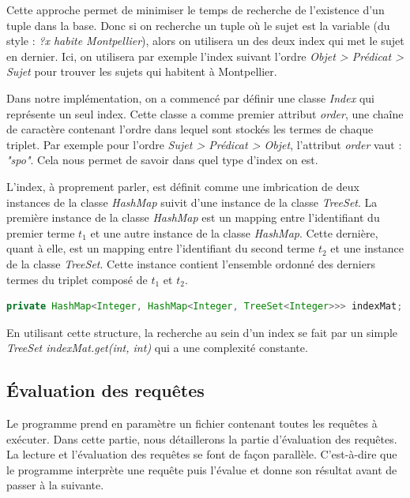 \documentclass[12pt,titlepage]{article}
\begin{document}
Cette approche permet de minimiser le temps de recherche de l'existence d'un tuple dans la base. Donc si on recherche un tuple où le sujet est la variable (du style : \textit{?x habite Montpellier}), alors on utilisera un des deux index qui met le sujet en dernier. Ici, on utilisera par exemple l'index suivant l'ordre \textit{Objet > Prédicat > Sujet} pour trouver les sujets qui habitent à Montpellier.


Dans notre implémentation, on a commencé par définir une classe \textit{Index} qui représente un seul index. Cette classe a comme premier attribut \textit{order}, une chaîne de caractère contenant l'ordre dans lequel sont stockés les termes de chaque triplet. Par exemple pour l'ordre \textit{Sujet > Prédicat > Objet}, l'attribut \textit{order} vaut : \textit{"spo"}. Cela nous permet de savoir dans quel type d'index on est.

L'index, à proprement parler, est définit comme une imbrication de deux instances de la classe \textit{HashMap} suivit d'une instance de la classe \textit{TreeSet}. La première instance de la classe \textit{HashMap} est un mapping entre l'identifiant du premier terme \textit{$t_1$} et une autre instance de la classe \textit{HashMap}. Cette dernière, quant à elle, est un mapping entre l'identifiant du second terme \textit{$t_2$} et une instance de la classe \textit{TreeSet}. Cette instance contient l'ensemble ordonné des derniers termes du triplet composé de $t_1$ et $t_2$.

\begin{lstlisting}[language=Java]
	private HashMap<Integer, HashMap<Integer, TreeSet<Integer>>> indexMat;
\end{lstlisting}

En utilisant cette structure, la recherche au sein d'un index se fait par un simple \textit{TreeSet indexMat.get(int, int)} qui a une complexité constante.

\subsection{Évaluation des requêtes}

Le programme prend en paramètre un fichier contenant toutes les requêtes à exécuter.
Dans cette partie, nous détaillerons la partie d'évaluation des requêtes. La lecture et l'évaluation des requêtes se font de façon parallèle. C'est-à-dire que le programme interprète une requête puis l'évalue et donne son résultat avant de passer à la suivante.
\end{document}
